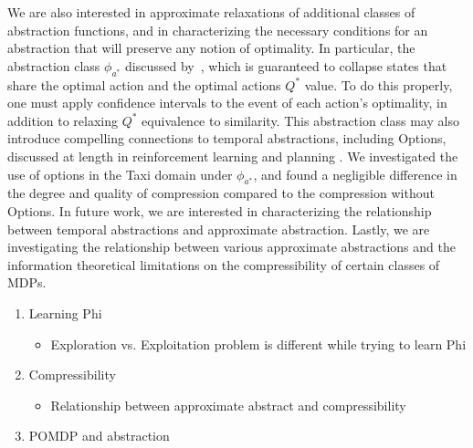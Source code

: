 We are also interested in approximate relaxations of additional classes of abstraction functions, and in characterizing the necessary conditions for an abstraction that will preserve any notion of optimality. In particular, the abstraction class $\phi_{a^*}$ discussed by~\cite{li2006towards}, which is guaranteed to collapse states that share the optimal action and the optimal actions $Q^*$ value. To do this properly, one must apply confidence intervals to the event of each action's optimality, in addition to relaxing $Q^*$ equivalence to similarity. This abstraction class may also introduce compelling connections to temporal abstractions, including Options, discussed at length in reinforcement learning and planning . We investigated the use of options in the Taxi domain under $\phi_{a^*}$, and found a negligible difference in the degree and quality of compression compared to the compression without Options. In future work, we are interested in characterizing the relationship between temporal abstractions and approximate abstraction. Lastly, we are investigating the relationship between various approximate abstractions and the information theoretical limitations on the compressibility of certain classes of \acp{MDP}.



\begin{enumerate}
\item Learning Phi
\begin{itemize}
\item Exploration vs. Exploitation problem is different while trying to learn Phi
\end{itemize}
\item Compressibility
\begin{itemize}
\item Relationship between approximate abstract and compressibility
\end{itemize}
\item POMDP and abstraction
\end{enumerate}

